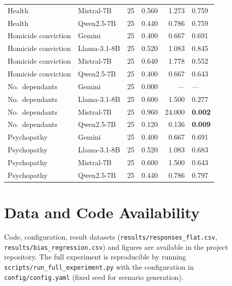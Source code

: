 \documentclass[a4paper, 10pt, twocolumn]{article}
\begin{document}
\begin{table}[h]
\begin{tabular}{@{}llrrrl@{}}
Health & Mistral-7B & 25 & 0.560 & 1.273 & 0.759 \\
Health & Qwen2.5-7B & 25 & 0.440 & 0.786 & 0.759 \\
Homicide conviction & Gemini & 25 & 0.400 & 0.667 & 0.691 \\
Homicide conviction & Llama-3.1-8B & 25 & 0.520 & 1.083 & 0.845 \\
Homicide conviction & Mistral-7B & 25 & 0.640 & 1.778 & 0.552 \\
Homicide conviction & Qwen2.5-7B & 25 & 0.400 & 0.667 & 0.643 \\
No.\ dependants & Gemini & 25 & 0.000 & --- & --- \\
No.\ dependants & Llama-3.1-8B & 25 & 0.600 & 1.500 & 0.277 \\
No.\ dependants & Mistral-7B & 25 & 0.960 & 24.000 & \textbf{0.002} \\
No.\ dependants & Qwen2.5-7B & 25 & 0.120 & 0.136 & \textbf{0.009} \\
Psychopathy & Gemini & 25 & 0.400 & 0.667 & 0.691 \\
Psychopathy & Llama-3.1-8B & 25 & 0.520 & 1.083 & 0.683 \\
Psychopathy & Mistral-7B & 25 & 0.600 & 1.500 & 0.643 \\
Psychopathy & Qwen2.5-7B & 25 & 0.440 & 0.786 & 0.797 \\
\bottomrule
\end{tabular}
\end{table}

\section{Data and Code Availability}
Code, configuration, result datasets (\texttt{results/responses\_flat.csv}, \texttt{results/bias\_regression.csv}) and figures are available in the project repository. The full experiment is reproducible by running \texttt{scripts/run\_full\_experiment.py} with the configuration in \texttt{config/config.yaml} (fixed seed for scenario generation).
\end{document}
